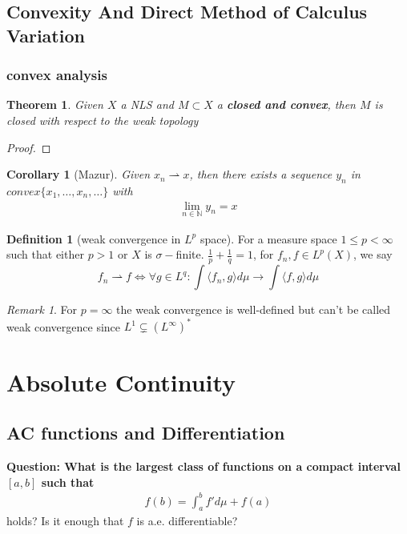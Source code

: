 \documentclass[a4paper,11pt,fleqn]{book}
\newtheorem{theorem}{Theorem}[section]
\newtheorem{corollary}{Corollary}[theorem]
\theoremstyle{definition}
\newtheorem{definition}{Definition}[section]
\theoremstyle{remark}
\newtheorem*{remark}{Remark}
\begin{document}
\subsection{Convexity And Direct Method of Calculus Variation}
\subsubsection{convex analysis}
\begin{theorem}
	Given $X$ a NLS and $M\subset X$ a \textbf{closed and convex}, then $M$ is closed with respect to the weak topology
\end{theorem}
\begin{proof}
	
\end{proof}

\begin{corollary}[Mazur]
	Given $x_n \rightharpoonup x$, then there exists a sequence $y_n$ in $convex\{x_1, \dots, x_n, \dots \}$ with 
	\begin{align*}
		\lim_{n \in \mathbb{N}} y_n = x
	\end{align*}
\end{corollary}

\begin{definition}[weak convergence in $L^p$ space]
For a measure space $1 \leq p < \infty$ such that either $p>1$ or $X$ is $\sigma-$finite. $\frac{1}{p} + \frac{1}{q} = 1$, for $f_n, f \in L^p(X)$, we say
\begin{equation*}
	f_n \rightharpoonup f \Leftrightarrow \forall g \in L^q :   \int \langle f_n, g \rangle d\mu \rightarrow \int \langle f, g \rangle d\mu 
\end{equation*}
\end{definition}
\begin{remark}
For $p = \infty$ the weak convergence is well-defined but can't be called weak convergence since $L^1 \subsetneq (L^\infty)^*$	
\end{remark}



\newpage
\section{Absolute Continuity}
\subsection{AC functions and Differentiation}
\textbf{Question: What is the largest class of functions on a compact interval $[a, b]$ such that }
\begin{align*}
	f(b) = \int_a^b f'd\mu + f(a)
\end{align*}
holds? Is it enough that $f$ is a.e. differentiable?
\end{document}
